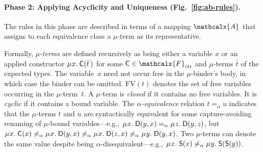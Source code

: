 \documentclass[smallcondensed,draft]{svjour3}
\newcommand\MU{\vvthinspace\mu\vvthinspace}
\newcommand\FV{\mathrm{FV}}
\newcommand\const[1]{\textsf{#1}}
\renewcommand{\vec}[1]{\bar #1}
\newcommand{\rn}[1]{\textsf{#1}}
\newcommand{\Val}{\mathcalx{A}\vvthinspace}
\newcommand{\aequiv}{\mathrel{=_\alpha}}
\newcommand\Types{\mathcalx{Y}}
\newcommand\Funcs{\mathcalx{F}}
\newcommand\Codata{\Types_{\mathrm{codt}}}
\newcommand\Ctr{\Funcs_{\smash{\mathrm{ctr}}}}
\newcommand\vvthinspace{\kern+0.041667em}
\begin{document}
\paragraph{Phase 2: Applying Acyclicity and Uniqueness \rm(Fig.~\ref{fig:ab-rules}).}
The rules in this phase are described in terms of a mapping $\Val$
that assigns to each equivalence class a $\mu$-term as its representative.

Formally, $\mu$-\emph{terms} are defined recursively as being either a variable $x$
or an applied constructor
$\MU x.\: \const{C}( \vec t\, )$ for some $\const{C} \in \Ctr$ and
$\mu$-terms $\vec t$ of the expected types.
The variable~$x$ need not occur free in the $\mu$-binder's body, in which case
the binder can be omitted.
$\FV( t )$ denotes the set of free variables occurring in the $\mu$-term~$t$.
A $\mu$-term is \emph{closed} if %
it contains no free variables. It is \emph{cyclic} if %
it contains a bound variable. The $\alpha$\emph{-equiv\-alence} relation $t \aequiv u$
indicates that the $\mu$-terms $t$ and $u$
are syntactically equivalent for some capture-avoiding renaming of $\mu$-bound variables---e.g.,
$\MU x.\; \const{D}( y, x ) \aequiv \MU z.\; \const{D}( y, z )$,
but
$\MU x.\; \const{C}( x ) \not\aequiv \MU x.\; \const{D}( y, x ) \not\aequiv \MU x.\; \const{D}( z, x )
\not\aequiv \MU y.\; \const{D}( y, x )$.
Two $\mu$-terms can denote the same value despite being $\alpha$-disequivalent---e.g.,
$\MU x.\; \const{S}( x ) \not\aequiv \MU y.\; \const{S}( \const{S}( y ) )$.

\end{document}
